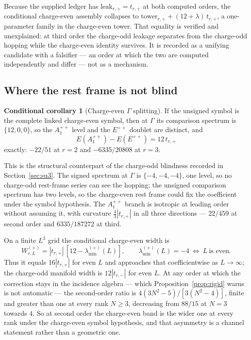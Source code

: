 \documentclass[11pt]{article}
\theoremstyle{plain}
\theoremstyle{definition}
\newtheorem{conditional}[theorem]{Conditional corollary}
\theoremstyle{remark}
\newcommand{\chk}[1]{}
\begin{document}
Because the supplied ledger has $\mathrm{leak}_{r,+}=t_{r,+}$ at both computed
orders, the conditional charge-even assembly collapses to
$\mathrm{tower}_{r,+}+(12+\lambda)\,t_{r,+}$, a one-parameter family in the
charge-even tower. That
equality is verified and unexplained: at third order the charge-odd leakage
separates from the charge-odd hopping while the charge-even identity survives.
It is recorded as a unifying candidate with a falsifier --- an order at which
the two are computed independently and differ --- not as a mechanism.
\chk{both declared coincidences, checked: one is ell\_N at all ranks, the other is bare}

\subsection{Where the rest frame is not blind}

\begin{conditional}[Charge-even $\Gamma$ splitting]\label{prop:evengamma}
If the unsigned symbol is the complete linked charge-even symbol, then at
$\Gamma$ its comparison spectrum is $\{12,0,0\}$, so the $A_1^{++}$ level
and the $E^{++}$ doublet are distinct, and
\[
  E(A_1^{++})-E(E^{++})=12\,t_{r,+}
\]
exactly: $-22/51$ at $r=2$ and $-6335/20808$ at $r=3$.
\end{conditional}
\chk{the C-even Gamma point pins t\_+, exactly where no C-odd Gamma datum can}

This is the structural counterpart of the charge-odd blindness recorded in
Section~\ref{sec:su3}. The signed spectrum at $\Gamma$ is $\{-4,-4,-4\}$, one
level, so no charge-odd rest-frame series can see the hopping; the unsigned
comparison spectrum has two levels, so the charge-even rest frame could fix
the coefficient under the symbol hypothesis. The $A_1^{++}$
branch is isotropic at leading order without assuming it, with curvature
$\tfrac43|t_{r,+}|$ in all three directions --- $22/459$ at second order and
$6335/187272$ at third.
\chk{the C-even curvature is (4/3)|t\_+| at both orders, and isotropic}

On a finite $L^3$ grid the conditional charge-even width is
\[
 W^{(+)}_{r,L}=|t_{r,+}|\,[12-\lambda_{\min}^{(+)}(L)],
 \qquad \lambda_{\min}^{(+)}(L)=-4\ \Longleftrightarrow\ L\ \text{is even}.
\]
Thus it equals $16|t_{r,+}|$ for even $L$ and approaches that coefficientwise
as $L\to\infty$; the charge-odd manifold width is $12|t_{r,-}|$ for even $L$.
At any order at which the correction
stays in the incidence algebra --- which Proposition~\ref{prop:rigid} warns is
not automatic --- the second-order ratio is $4(3N^2-5)/[3(N^2-4)]$, finite and
greater than one at every rank $N\ge3$, decreasing from $88/15$ at $N=3$
towards $4$. So at second order the charge-even band is the wider one at every
rank under the charge-even symbol hypothesis, and that asymmetry is a channel
statement rather than a geometric one.
\chk{the C-even bandwidth is 16|t\_+| at every order; the C-odd manifold width is 12|t\_-|}
\chk{at N = 2 the C-odd hopping vanishes and the C-even one does not}
\end{document}
